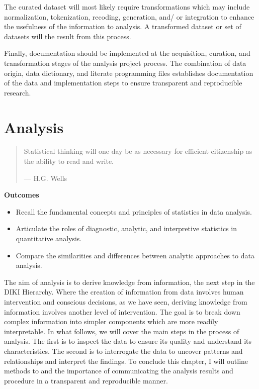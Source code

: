 \documentclass[
  letterpaper,
]{latex/krantz}
\providecommand{\tightlist}{%
  \setlength{\itemsep}{0pt}\setlength{\parskip}{0pt}}\usepackage{longtable,booktabs,array}
\theoremstyle{definition}
\theoremstyle{remark}
\begin{document}
The curated dataset will most likely require transformations which may
include normalization, tokenization, recoding, generation, and/ or
integration to enhance the usefulness of the information to analysis. A
transformed dataset or set of datasets will the result from this
process.

Finally, documentation should be implemented at the acquisition,
curation, and transformation stages of the analysis project process. The
combination of data origin, data dictionary, and literate programming
files establishes documentation of the data and implementation steps to
ensure transparent and reproducible research.

\chapter{Analysis}\label{sec-analysis-chapter}

\begin{quote}
Statistical thinking will one day be as necessary for efficient
citizenship as the ability to read and write.

--- H.G. Wells
\end{quote}

\begin{tcolorbox}[enhanced jigsaw, breakable, leftrule=.75mm, arc=.35mm, colframe=quarto-callout-color-frame, colback=white, left=2mm, bottomrule=.15mm, rightrule=.15mm, toprule=.15mm, opacityback=0]

\textbf{ Outcomes}

\begin{itemize}
\tightlist
\item
  Recall the fundamental concepts and principles of statistics in data
  analysis.
\item
  Articulate the roles of diagnostic, analytic, and interpretive
  statistics in quantitative analysis.
\item
  Compare the similarities and differences between analytic approaches
  to data analysis.
\end{itemize}

\end{tcolorbox}

The aim of analysis is to derive knowledge from information, the next
step in the DIKI Hierarchy. Where the creation of information from data
involves human intervention and conscious decisions, as we have seen,
deriving knowledge from information involves another level of
intervention. The goal is to break down complex information into simpler
components which are more readily interpretable. In what follows, we
will cover the main steps in the process of analysis. The first is to
inspect the data to ensure its quality and understand its
characteristics. The second is to interrogate the data to uncover
patterns and relationships and interpret the findings. To conclude this
chapter, I will outline methods to and the importance of communicating
the analysis results and procedure in a transparent and reproducible
manner.
\end{document}

